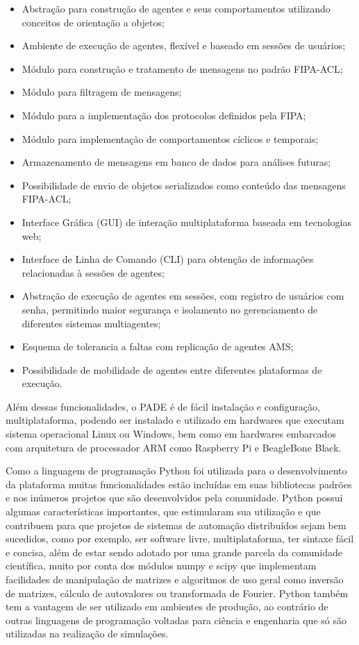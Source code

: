 \documentclass[journal]{IEEEtran}
\begin{document}
\begin{itemize}
  \item Abstração para construção de agentes e seus comportamentos utilizando conceitos de orientação a objetos;
  \item Ambiente de execução de agentes, flexível e baseado em sessões de usuários;
  \item Módulo para construção e tratamento de mensagens no padrão FIPA-ACL;
  \item Módulo para filtragem de mensagens;
  \item Módulo para a implementação dos protocolos definidos pela FIPA;
  \item Módulo para implementação de comportamentos cíclicos e temporais;
  \item Armazenamento de mensagens em banco de dados para análises futuras;
  \item Possibilidade de envio de objetos serializados como conteúdo das mensagens FIPA-ACL;
  \item Interface Gráfica (GUI) de interação multiplataforma baseada em tecnologias web;
  \item Interface de Linha de Comando (CLI) para obtenção de informações relacionadas à sessões de agentes;
  \item Abstração de execução de agentes em sessões, com registro de usuários com senha, permitindo maior segurança e isolamento no gerenciamento de diferentes sistemas multiagentes;
  \item Esquema de tolerancia a faltas com replicação de agentes AMS;
  \item Possibilidade de mobilidade de agentes entre diferentes plataformas de execução.
\end{itemize}

Além dessas funcionalidades, o PADE é de fácil instalação e configuração, multiplataforma, podendo ser instalado e utilizado em hardwares que executam sistema operacional Linux ou Windows, bem como em hardwares embarcados com arquitetura de processador ARM como Raspberry Pi e BeagleBone Black.

Como a linguagem de programação Python foi utilizada para o desenvolvimento da plataforma muitas funcionalidades estão incluídas em suas bibliotecas padrões e nos inúmeros projetos que são desenvolvidos pela comunidade. Python possui algumas características importantes, que estimularam sua utilização e que contribuem para que projetos de sistemas de automação distribuídos sejam bem sucedidos, como por exemplo, ser software livre, multiplataforma, ter sintaxe fácil e concisa, além de estar sendo adotado por uma grande parcela da comunidade científica, muito por conta dos módulos numpy e scipy que implementam facilidades de manipulação de matrizes e algoritmos de uso geral como inversão de matrizes, cálculo de autovalores ou transformada de Fourier. Python também tem a vantagem de ser utilizado em ambientes de produção, ao contrário de outras linguagens de programação voltadas para ciência e engenharia que só são utilizadas na realização de simulações.
\end{document}
